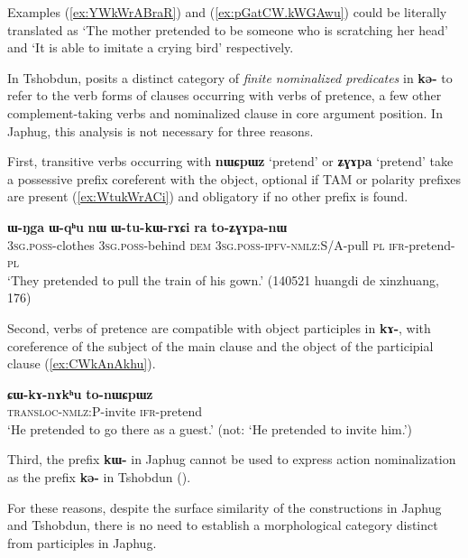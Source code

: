 \documentclass[oneside,a4paper,11pt]{article}
\newcommand{\ipa}[1]{\textbf{\phon#1}} %
\newcommand{\jpg}[2]{\ipa{#1} `#2'} %
\begin{document}
Examples (\ref{ex:YWkWrABraR}) and (\ref{ex:pGatCW.kWGAwu}) could be literally translated as `The mother pretended to be someone who is scratching her head' and `It is able to imitate a crying bird' respectively. 

In Tshobdun, \citet[481-2]{sun12complementation} posits a distinct category of \textit{finite nominalized predicates} in \ipa{kə-} to refer to the verb forms of clauses occurring with verbs of pretence, a few other complement-taking verbs and nominalized clause in core argument position. In Japhug, this analysis is not necessary for three reasons. 

First, transitive verbs occurring with \jpg{nɯɕpɯz}{pretend} or \jpg{ʑɣɤpa}{pretend} take a possessive prefix coreferent with the object, optional if TAM or polarity prefixes are present (\ref{ex:WtukWrACi}) and obligatory if no other prefix is found.

\begin{exe}
\ex \label{ex:WtukWrACi}
\gll \ipa{ɯ-ŋga} 	\ipa{ɯ-qʰu} 	\ipa{nɯ} 	\ipa{ɯ-tu-kɯ-rɤɕi} 	\ipa{ra} 	\ipa{to-ʑɣɤpa-nɯ}  \\
\textsc{3sg.poss}-clothes \textsc{3sg.poss}-behind \textsc{dem} \textsc{3sg.poss-ipfv-nmlz}:S/A-pull \textsc{pl} \textsc{ifr}-pretend-\textsc{pl} \\
\glt  `They pretended to pull the train of his gown.' (140521 huangdi de xinzhuang, 176)
\end{exe}

Second, verbs of pretence are compatible with object participles in \ipa{kɤ-}, with coreference of the subject of the main clause and the object of the participial clause (\ref{ex:CWkAnAkhu}).

\begin{exe}
\ex \label{ex:CWkAnAkhu}
\gll   	\ipa{ɕɯ-kɤ-nɤkʰu} 	 \ipa{to-nɯɕpɯz}  \\
 \textsc{transloc-nmlz:P}-invite \textsc{ifr}-pretend  \\
\glt  `He pretended to go there as a guest.' (not: `He pretended to invite him.')
\end{exe}

Third, the prefix \ipa{kɯ-} in Japhug cannot be used to express action nominalization as the prefix \ipa{kə-} in Tshobdun (\citealt[482]{sun12complementation}). 

For these reasons, despite the surface similarity of the constructions in Japhug and Tshobdun, there is no need to establish a morphological category distinct from participles in Japhug.
\end{document}
